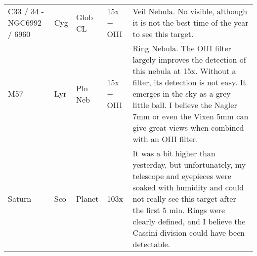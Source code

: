 \begin{longtable}{ p{0.7in}  p{0.3in}  p{0.6in}  p{0.9in}  p{5.8in} }
C33 / 34 - NGC6992 / 6960 & Cyg & Glob CL & 15x + OIII & Veil Nebula. No visible, although it is not the best time of the year to see this target. \\ 
M57 & Lyr & Pln Neb & 15x + OIII & Ring Nebula. The OIII filter largely improves the detection of this nebula at 15x. Without a filter, its detection is not easy. It emerges in the sky as a grey little ball. I believe the Nagler 7mm or even the Vixen 5mm can give great views when combined with an OIII filter. \\ 
Saturn & Sco & Planet & 103x & It was a bit higher than yesterday, but unfortunately, my telescope and eyepieces were soaked with humidity and could not really see this target after the first 5 min. Rings were clearly defined, and I believe the Cassini division could have been detectable. \\ 
\hline 
\end{longtable} 
